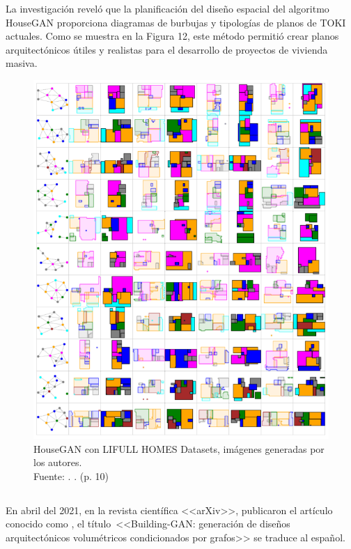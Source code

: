 La investigación reveló que la planificación del diseño espacial del algoritmo HouseGAN proporciona diagramas de burbujas y tipologías de planos de TOKI actuales. Como se muestra en la Figura 12, este método permitió crear planos arquitectónicos útiles y realistas para el desarrollo de proyectos de vivienda masiva.

\begin{figure}[!ht]
	\begin{center}
		\includegraphics[width=1\textwidth]{2/figures/ozerol2023.png}
		\caption[HouseGAN con LIFULL HOMES Datasets, imágenes generadas por los autores]{HouseGAN con LIFULL HOMES Datasets, imágenes generadas por los autores.\\
		Fuente: \cite{pr_ozerol2023genermass}. . (p. 10)}
		\label{2:fig120}
	\end{center}
\end{figure}

\subsection{}
En abril del 2021, en la revista científica <<arXiv>>, \cite{pr_chang2021buildinggan} publicaron el artículo conocido como , el título <<Building-GAN: generación de diseños arquitectónicos volumétricos condicionados por grafos>> se traduce al español.

